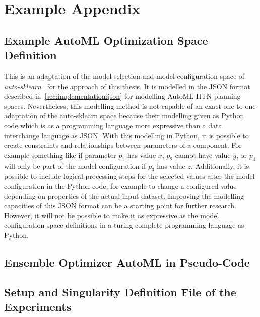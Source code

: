 %
\chapter{Example Appendix}
\label{sec:appendix}

\Blindtext[1][1]

\section{Example AutoML Optimization Space Definition}
\label{sec:appendix:htn-space}
This is an adaptation of the model selection and model configuration space of \textit{auto-sklearn}~\cite{Feurer-AutoSklearn} for the approach of this thesis.
It is modelled in the JSON format described in~\ref{sec:implementation:json} for modelling AutoML HTN planning spaces.\newline
Nevertheless, this modelling method is not capable of an exact one-to-one adaptation of the auto-sklearn space because their modelling given as Python code which is as a programming language more expressive than a data interchange language as JSON.
With this modelling in Python, it is possible to create constraints and relationships between parameters of a component.
For example something like if parameter $p_1$ has value $x$, $p_2$ cannot have value $y$, or $p_4$ will only be part of the model configuration if $p_3$ has value $z$.
Additionally, it is possible to include logical processing steps for the selected values after the model configuration in the Python code, for example to change a configured value depending on properties of the actual input dataset.\newline
Improving the modelling capacities of this JSON format can be a starting point for further research.
However, it will not be possible to make it as expressive as the model configuration space definitions in a turing-complete programming language as Python.

\Blindtext[1][1]

\section{Ensemble Optimizer AutoML in Pseudo-Code}
\label{sec:appendix:pseudo-code}

\Blindtext[1][1]

\section{Setup and Singularity Definition File of the Experiments}
\label{sec:appendix:singularity}

\Blindtext[1][1]

\Blindtext[1][2]
